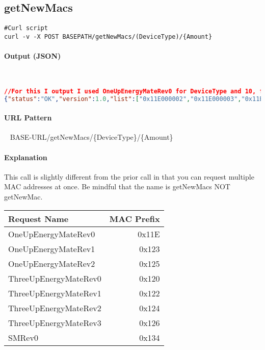 \documentclass[
10pt, %
letterpaper, %
oneside, %
headinclude,footinclude, %
BCOR5mm, %
]{scrartcl}
\begin{document}

\subsection{getNewMacs}
\begin{lstlisting}
#Curl script 
curl -v -X POST BASEPATH/getNewMacs/(DeviceType)/{Amount}
\end{lstlisting}

\paragraph{Output (JSON)}~
\begin{lstlisting}[language=json]
//For this I output I used OneUpEnergyMateRev0 for DeviceType and 10, for Amount
{"status":"OK","version":1.0,"list":["0x11E000002","0x11E000003","0x11E000004","0x11E000005","0x11E000006","0x11E000007","0x11E000008","0x11E000009","0x11E00000A","0x11E00000B"]}
\end{lstlisting}

\paragraph{URL Pattern} 
~\newline
BASE-URL/getNewMacs/\{DeviceType\}/\{Amount\}

\paragraph{Explanation}
This call is slightly different from the prior call in that you can request multiple MAC addresses at once. Be mindful that the name is getNewMacs NOT getNewMac. 
~\newline
\begin{tabular}{| l | r |}
\hline
\textbf{Request Name} & \textbf{MAC Prefix} \\
\hline
OneUpEnergyMateRev0 & 0x11E \\
OneUpEnergyMateRev1 & 0x123 \\
OneUpEnergyMateRev2 & 0x125 \\
ThreeUpEnergyMateRev0 & 0x120 \\
ThreeUpEnergyMateRev1 & 0x122 \\
ThreeUpEnergyMateRev2 & 0x124 \\
ThreeUpEnergyMateRev3 & 0x126 \\
SMRev0 & 0x134 \\
\hline
\end{tabular}
\end{document}

